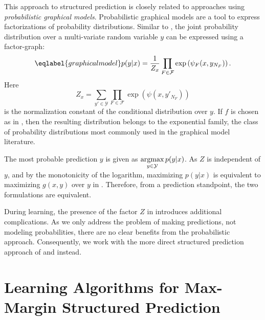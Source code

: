 This approach to structured prediction is closely related to 
approaches using \emph{probabilistic graphical models}.  Probabilistic graphical models are a
tool to express factorizations of probability distributions.  Similar to
, the joint probability distribution over a
multi-variate random variable $y$ can be expressed using a factor-graph:
\begin{equation}\eqlabel{graphicalmodel}
    p(y | x) = \frac{1}{Z_x}\prod_{F \in \mathcal{F}} \exp\left(\psi_F(x, y_{N_F})\right).
\end{equation}
Here
\begin{equation}
    Z_x = \sum_{y' \in \mathcal{Y}} \prod_{F \in \mathcal{F}} \exp\left(\psi(x, y'_{N_F})\right)
\end{equation}
is the normalization constant of the conditional distribution over $y$.
If $f$ is chosen as in , then the resulting distribution
belongs to the exponential family, the class of probability distributions most
commonly used in the graphical model literature.

The most probable prediction $y$ is given as $\displaystyle \operatorname*{argmax}_{y \in \mathcal{Y}}p(y|x)$.
As $Z$ is independent of $y$, and by the monotonicity of the logarithm,
maximizing $p(y|x)$ is equivalent to maximizing $g(x,y)$ over $y$ in
. Therefore, from a prediction standpoint, the two
formulations are equivalent.

During learning, the presence of the factor $Z$ in 
introduces additional complications. As we only address the problem of making
predictions, not modeling probabilities, there are no clear benefits from the
probabilistic approach.  Consequently, we work with the more direct
structured prediction approach of  and
 instead.



\section{Learning Algorithms for Max-Margin Structured Prediction}

